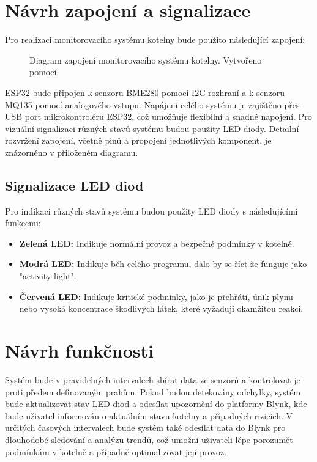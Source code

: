 \documentclass[12pt, twoside]{article} %
\begin{document}
\section{Návrh zapojení a signalizace}
Pro realizaci monitorovacího systému kotelny bude použito následující zapojení:
\begin{figure}[H]
    \centering
    
    \caption{Diagram zapojení monitorovacího systému kotelny. Vytvořeno pomocí \autocite{circuit2tikz_designer}}
    \label{fig:flowchart}
\end{figure}ESP32 bude připojen k senzoru BME280 pomocí I2C rozhraní a k senzoru MQ135 pomocí analogového vstupu. Napájení celého systému je zajištěno přes USB port mikrokontroléru ESP32, což umožňuje flexibilní a snadné napojení. Pro vizuální signalizaci různých stavů systému budou použity LED diody. Detailní rozvržení zapojení, včetně pinů a propojení jednotlivých komponent, je znázorněno v přiloženém diagramu.


\subsection{Signalizace LED diod}
\label{sec:signalizace_led}
Pro indikaci různých stavů systému budou použity LED diody s následujícími funkcemi:
\begin{itemize}
    \item \textbf{Zelená LED:} Indikuje normální provoz a bezpečné podmínky v kotelně.
    \item \textbf{Modrá LED:} Indikuje běh celého programu, dalo by se říct že funguje jako "activity light".
    \item \textbf{Červená LED:} Indikuje kritické podmínky, jako je přehřátí, únik plynu nebo vysoká koncentrace škodlivých látek, které vyžadují okamžitou reakci.
\end{itemize}

\section{Návrh funkčnosti}
Systém bude v pravidelných intervalech sbírat data ze senzorů a kontrolovat je proti předem definovaným prahům. Pokud budou detekovány odchylky, systém bude aktualizovat stav LED diod a odesílat upozornění do platformy Blynk, kde bude uživatel informován o aktuálním stavu kotelny a případných rizicích.
V určitých časových intervalech bude systém také odesílat data do Blynk pro dlouhodobé sledování a analýzu trendů, což umožní uživateli lépe porozumět podmínkám v kotelně a případně optimalizovat její provoz.
\end{document}
